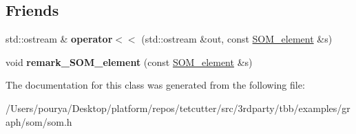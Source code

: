 \subsection*{Friends}
\begin{DoxyCompactItemize}
\item 
\hypertarget{classSOM__element_a7497688921da4d2f8bd8520af3536a01}{}std\+::ostream \& {\bfseries operator$<$$<$} (std\+::ostream \&out, const \hyperlink{classSOM__element}{S\+O\+M\+\_\+element} \&s)\label{classSOM__element_a7497688921da4d2f8bd8520af3536a01}

\item 
\hypertarget{classSOM__element_afaa2673447b95792a0e5b635cabe250f}{}void {\bfseries remark\+\_\+\+S\+O\+M\+\_\+element} (const \hyperlink{classSOM__element}{S\+O\+M\+\_\+element} \&s)\label{classSOM__element_afaa2673447b95792a0e5b635cabe250f}

\end{DoxyCompactItemize}


The documentation for this class was generated from the following file\+:\begin{DoxyCompactItemize}
\item 
/\+Users/pourya/\+Desktop/platform/repos/tetcutter/src/3rdparty/tbb/examples/graph/som/som.\+h\end{DoxyCompactItemize}
